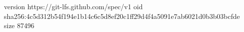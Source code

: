 version https://git-lfs.github.com/spec/v1
oid sha256:4c5d312b54f194e1b14c6c5d8ef20c1ff29d4f4a5091e7ab6021d0b3b03bcfde
size 87496
